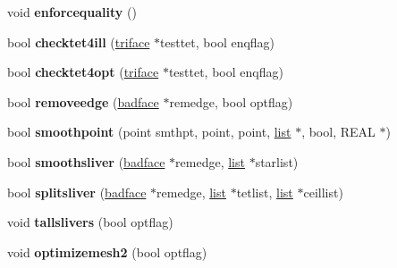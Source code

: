 \begin{DoxyCompactItemize}
\item 
\hypertarget{classtetgenmesh_a128ef723494d75c5d2ee64d209263d0c}{void {\bfseries enforcequality} ()}\label{classtetgenmesh_a128ef723494d75c5d2ee64d209263d0c}

\item 
\hypertarget{classtetgenmesh_a6ed6041549b47473791c019892fb3204}{bool {\bfseries checktet4ill} (\hyperlink{classtetgenmesh_1_1triface}{triface} $\ast$testtet, bool enqflag)}\label{classtetgenmesh_a6ed6041549b47473791c019892fb3204}

\item 
\hypertarget{classtetgenmesh_a702073da63e059486c40b50ea8a18354}{bool {\bfseries checktet4opt} (\hyperlink{classtetgenmesh_1_1triface}{triface} $\ast$testtet, bool enqflag)}\label{classtetgenmesh_a702073da63e059486c40b50ea8a18354}

\item 
\hypertarget{classtetgenmesh_a575dc597208edd687c26c75fe4a26bf2}{bool {\bfseries removeedge} (\hyperlink{structtetgenmesh_1_1badface}{badface} $\ast$remedge, bool optflag)}\label{classtetgenmesh_a575dc597208edd687c26c75fe4a26bf2}

\item 
\hypertarget{classtetgenmesh_a29fcd95faad242e47304c1b70545b568}{bool {\bfseries smoothpoint} (point smthpt, point, point, \hyperlink{classtetgenmesh_1_1list}{list} $\ast$, bool, R\-E\-A\-L $\ast$)}\label{classtetgenmesh_a29fcd95faad242e47304c1b70545b568}

\item 
\hypertarget{classtetgenmesh_ac104e376322fd8ce545a4083f49fc9e4}{bool {\bfseries smoothsliver} (\hyperlink{structtetgenmesh_1_1badface}{badface} $\ast$remedge, \hyperlink{classtetgenmesh_1_1list}{list} $\ast$starlist)}\label{classtetgenmesh_ac104e376322fd8ce545a4083f49fc9e4}

\item 
\hypertarget{classtetgenmesh_aecc8f0babcf7b1893476eb64862e838e}{bool {\bfseries splitsliver} (\hyperlink{structtetgenmesh_1_1badface}{badface} $\ast$remedge, \hyperlink{classtetgenmesh_1_1list}{list} $\ast$tetlist, \hyperlink{classtetgenmesh_1_1list}{list} $\ast$ceillist)}\label{classtetgenmesh_aecc8f0babcf7b1893476eb64862e838e}

\item 
\hypertarget{classtetgenmesh_a1ab2a66d404e5b04f88d568c3dedfa28}{void {\bfseries tallslivers} (bool optflag)}\label{classtetgenmesh_a1ab2a66d404e5b04f88d568c3dedfa28}

\item 
\hypertarget{classtetgenmesh_a28adb2e75e6f7fc03f444132881c8289}{void {\bfseries optimizemesh2} (bool optflag)}\label{classtetgenmesh_a28adb2e75e6f7fc03f444132881c8289}


\end{DoxyCompactItemize}
